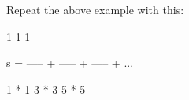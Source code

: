 Repeat the above example with this:

\begin{console}

      1       1       1 

s = ----- + ----- + ----- + ...

    1 * 1   3 * 3   5 * 5

\end{console}


